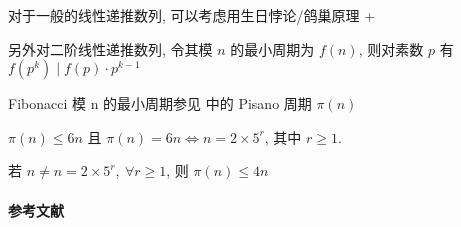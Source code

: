 对于一般的线性递推数列, 可以考虑用生日悖论/鸽巢原理 + 

另外对二阶线性递推数列, 令其模 \(n\) 的最小周期为 \(f(n)\), 则对素数 \(p\) 有 \(f\left(p^k\right)\mid f(p)\cdot p^{k-1}\)

Fibonacci 模 n 的最小周期参见  中的 Pisano 周期 \(\pi(n)\)

\(\pi(n)\leq 6n\) 且 \(\pi(n)=6n\iff n=2\times 5^r\), 其中 \(r\geq 1\).

若 \(n\neq n=2\times 5^r,~\forall r\geq 1\), 则 \(\pi(n)\leq 4n\)

\paragraph{参考文献} \cite{enwiki:1213681016}
